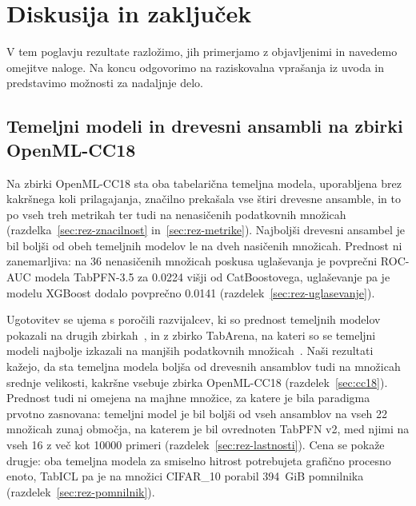 \documentclass[a4paper,12pt,openright]{book}
\begin{document}
\chapter{Diskusija in zaključek}
\label{ch:zakljucek}

V tem poglavju rezultate razložimo, jih primerjamo z objavljenimi in navedemo
omejitve naloge. Na koncu odgovorimo na raziskovalna vprašanja iz uvoda in
predstavimo možnosti za nadaljnje delo.

\section{Temeljni modeli in drevesni ansambli na zbirki OpenML-CC18}
\label{sec:disk-cc18}

Na zbirki OpenML-CC18 sta oba tabelarična temeljna modela, uporabljena brez
kakršnega koli prilagajanja, značilno prekašala vse štiri drevesne ansamble, in
to po vseh treh metrikah ter tudi na nenasičenih podatkovnih množicah
(razdelka~\ref{sec:rez-znacilnost} in~\ref{sec:rez-metrike}). Najboljši
drevesni ansambel je bil boljši od obeh temeljnih modelov le na dveh nasičenih
množicah. Prednost ni zanemarljiva: na 36 nenasičenih množicah poskusa
uglaševanja je povprečni ROC-AUC modela TabPFN-3.5 za \num{0.0224} višji od
CatBoostovega, uglaševanje pa je modelu XGBoost dodalo povprečno \num{0.0141}
(razdelek~\ref{sec:rez-uglasevanje}).

Ugotovitev se ujema s poročili razvijalcev, ki so prednost temeljnih modelov
pokazali na drugih zbirkah~\cite{grinsztajn2025tabpfn25,grinsztajn2026tabpfn3,qu2025tabicl},
in z zbirko TabArena, na kateri so se temeljni modeli najbolje izkazali na
manjših podatkovnih množicah~\cite{erickson2025tabarena}. Naši rezultati
kažejo, da sta temeljna modela boljša od drevesnih ansamblov tudi na množicah
srednje velikosti, kakršne vsebuje zbirka OpenML-CC18
(razdelek~\ref{sec:cc18}). Prednost tudi ni omejena na majhne množice, za katere je bila paradigma
prvotno zasnovana: temeljni model je bil boljši od vseh ansamblov na vseh 22
množicah zunaj območja, na katerem je bil ovrednoten TabPFN v2, med njimi na
vseh 16 z več kot \num{10000} primeri (razdelek~\ref{sec:rez-lastnosti}).
Cena se pokaže drugje: oba temeljna modela za smiselno hitrost potrebujeta
grafično procesno enoto, TabICL pa je na množici CIFAR\_10 porabil 394~GiB
pomnilnika (razdelek~\ref{sec:rez-pomnilnik}).
\end{document}

